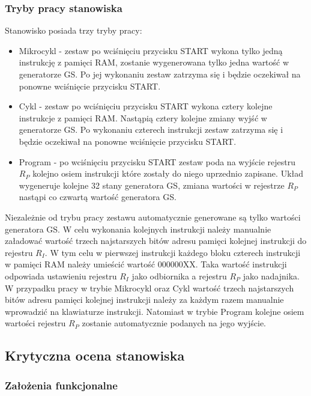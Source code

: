 \documentclass[../main.tex]{subfiles}
\begin{document}
    \subsubsection{Tryby pracy stanowiska}
    Stanowisko posiada trzy tryby pracy:
    \begin{itemize}
        \item  Mikrocykl - zestaw po wciśnięciu przycisku START wykona tylko jedną instrukcję z pamięci RAM, zostanie wygenerowana 
        tylko jedna wartość w generatorze GS. Po jej wykonaniu zestaw zatrzyma się i będzie oczekiwał na ponowne wciśnięcie przycisku START.
        \item  Cykl - zestaw po wciśnięciu przycisku START wykona cztery kolejne instrukcje z pamięci RAM. Nastąpią cztery kolejne zmiany
        wyjść w generatorze GS. Po wykonaniu czterech instrukcji zestaw zatrzyma się i będzie oczekiwał na ponowne wciśnięcie przycisku START.
        \item Program - po wciśnięciu przycisku START zestaw poda na wyjście rejestru $R_P$ kolejno osiem instrukcji które zostały
        do niego uprzednio zapisane. Układ wygeneruje kolejne 32 stany generatora GS, zmiana wartości w rejestrze $R_P$ nastąpi co czwartą
        wartość generatora GS.
    \end{itemize}

    Niezależnie od trybu pracy zestawu automatycznie generowane są tylko wartości generatora GS. W celu wykonania kolejnych instrukcji należy 
    manualnie załadować wartość trzech najstarszych bitów adresu pamięci kolejnej instrukcji do rejestru $R_I$. 
    W tym celu w pierwszej instrukcji każdego bloku czterech instrukcji w pamięci RAM należy umieścić wartość 000000XX. Taka wartość instrukcji 
    odpowiada ustawieniu rejestru $R_I$ jako odbiornika a rejestru $R_P$ jako nadajnika. W przypadku pracy w trybie Mikrocykl oraz Cykl wartość trzech
    najstarszych bitów adresu pamięci kolejnej instrukcji należy za każdym razem manualnie wprowadzić na klawiaturze instrukcji. Natomiast w trybie
    Program kolejne osiem wartości rejestru $R_P$ zostanie automatycznie podanych na jego wyjście.


\subsection{Krytyczna ocena stanowiska}

    \subsubsection{Założenia funkcjonalne}
\end{document}
